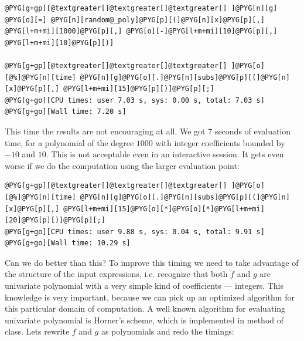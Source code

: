 \begin{Verbatim}[commandchars=@\[\]]
@PYG[g+gp][@textgreater[]@textgreater[]@textgreater[] ]@PYG[n][g] @PYG[o][=] @PYG[n][random@_poly]@PYG[p][(]@PYG[n][x]@PYG[p][,] @PYG[l+m+mi][1000]@PYG[p][,] @PYG[o][-]@PYG[l+m+mi][10]@PYG[p][,] @PYG[l+m+mi][10]@PYG[p][)]

@PYG[g+gp][@textgreater[]@textgreater[]@textgreater[] ]@PYG[o][@%]@PYG[n][time] @PYG[n][g]@PYG[o][.]@PYG[n][subs]@PYG[p][(]@PYG[n][x]@PYG[p][,] @PYG[l+m+mi][15]@PYG[p][)]@PYG[p][;]
@PYG[g+go][CPU times: user 7.03 s, sys: 0.00 s, total: 7.03 s]
@PYG[g+go][Wall time: 7.20 s]
\end{Verbatim}
\noindent
This time the results are not encouraging at all. We got $7$ seconds of evaluation time, for a
polynomial of the degree $1000$ with integer coefficients bounded by $-10$ and $10$. This is not
acceptable even in an interactive session. It gets even worse if we do the computation using the
larger evaluation point:

\begin{Verbatim}[commandchars=@\[\]]
@PYG[g+gp][@textgreater[]@textgreater[]@textgreater[] ]@PYG[o][@%]@PYG[n][time] @PYG[n][g]@PYG[o][.]@PYG[n][subs]@PYG[p][(]@PYG[n][x]@PYG[p][,] @PYG[l+m+mi][15]@PYG[o][*]@PYG[o][*]@PYG[l+m+mi][20]@PYG[p][)]@PYG[p][;]
@PYG[g+go][CPU times: user 9.88 s, sys: 0.04 s, total: 9.91 s]
@PYG[g+go][Wall time: 10.29 s]
\end{Verbatim}
\noindent
Can we do better than this? To improve this timing we need to take advantage of the structure
of the input expressions, i.e. recognize that both $f$ and $g$ are univariate polynomial with
a very simple kind of coefficients --- integers. This knowledge is very important, because we
can pick up an optimized algorithm for this particular domain of computation. A well known
algorithm for evaluating univariate polynomial is Horner's scheme, which is implemented in
\href{http://docs.python.org/library/functions.html\#eval}{} method of  class. Lets rewrite $f$ and $g$ as polynomials and redo
the timings:

